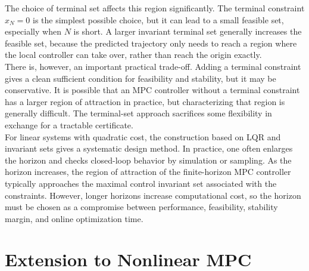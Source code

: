 The choice of terminal set affects this region significantly. The terminal constraint \(x_N=0\)
is the simplest possible choice, but it can lead to a small feasible set, especially when \(N\) is
short. A larger invariant terminal set generally increases the feasible set, because the predicted
trajectory only needs to reach a region where the local controller can take over, rather than
reach the origin exactly.\\
There is, however, an important practical trade-off. Adding a terminal constraint gives a clean
sufficient condition for feasibility and stability, but it may be conservative. It is possible that
an MPC controller without a terminal constraint has a larger region of attraction in practice,
but characterizing that region is generally difficult. The terminal-set approach sacrifices some
flexibility in exchange for a tractable certificate.\\

For linear systems with quadratic cost, the construction based on LQR and invariant sets gives
a systematic design method. In practice, one often enlarges the horizon and checks closed-loop
behavior by simulation or sampling. As the horizon increases, the region of attraction of the
finite-horizon MPC controller typically approaches the maximal control invariant set associated
with the constraints. However, longer horizons increase computational cost, so the horizon must
be chosen as a compromise between performance, feasibility, stability margin, and online
optimization time.

\section{Extension to Nonlinear MPC}

